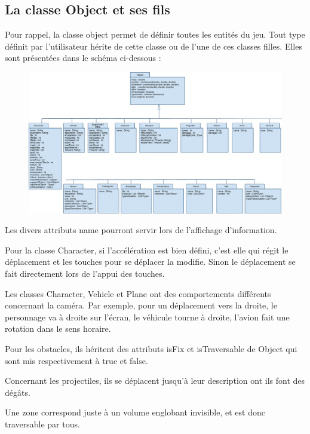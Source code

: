 \subsection{La classe Object et ses fils}

Pour rappel, la classe object permet de définir toutes les entités du jeu.
Tout type définit par l'utilisateur hérite de cette classe ou de l'une de ces classes filles.
Elles sont présentées dans le schéma ci-dessous :

\begin{figure}[h]
 \centering
 \includegraphics[width=\textwidth]{img/objectclass}
\end{figure}

Les divers attributs name pourront servir lors de l'affichage d'information.

Pour la classe Character, si l'accélération est bien défini, c'est elle qui régit le déplacement et les touches pour se déplacer la modifie.
Sinon le déplacement se fait directement lors de l'appui des touches.

Les classes Character, Vehicle et Plane ont des comportements différents concernant la caméra.
Par exemple, pour un déplacement vers la droite, le personnage va à droite sur l'écran, le véhicule tourne à droite, l'avion fait une rotation dans le sens horaire.

Pour les obstacles, ils héritent des attributs isFix et isTraversable de Object qui sont mis respectivement à true et false.

Concernant les projectiles, ils se déplacent jusqu'à leur description ont ils font des dégâts.

Une zone correspond juste à un volume englobant invisible, et est donc traversable par tous.

